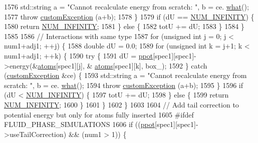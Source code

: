 \begin{DoxyCode}
1576                 std::string a = \textcolor{stringliteral}{"Cannot recalculate energy from scratch: "}, b = ce.
      \hyperlink{classcustom_exception_aeb6ab5848b038adfc68fde86a512f691}{what}();
1577                 \textcolor{keywordflow}{throw} \hyperlink{classcustom_exception}{customException} (a+b);
1578             \}
1579             \textcolor{keywordflow}{if} (dU == \hyperlink{potentials_8h_ab94ab1d09e2291d03fe92a0e24a9d33b}{NUM\_INFINITY}) \{
1580                 \textcolor{keywordflow}{return} \hyperlink{potentials_8h_ab94ab1d09e2291d03fe92a0e24a9d33b}{NUM\_INFINITY};
1581             \} \textcolor{keywordflow}{else} \{
1582                 totU += dU;
1583             \}
1584         \}
1585 
1586         \textcolor{comment}{// Interactions with same type}
1587         \textcolor{keywordflow}{for} (\textcolor{keywordtype}{unsigned} \textcolor{keywordtype}{int} j = 0; j < num1+adj1; ++j) \{
1588             \textcolor{keywordtype}{double} dU = 0.0;
1589             \textcolor{keywordflow}{for} (\textcolor{keywordtype}{unsigned} \textcolor{keywordtype}{int} k = j+1; k < num1+adj1; ++k) \{
1590                 \textcolor{keywordflow}{try} \{
1591                     dU = \hyperlink{classsim_system_ad2e290b5963f132e6a3a56cee35c8e9f}{ppot}[spec1][spec1]->energy(&\hyperlink{classsim_system_a90421b19082f7fb8fc23b7264b1161e4}{atoms}[spec1][j], &
      \hyperlink{classsim_system_a90421b19082f7fb8fc23b7264b1161e4}{atoms}[spec1][k], box\_);
1592                 \} \textcolor{keywordflow}{catch} (\hyperlink{classcustom_exception}{customException} &ce) \{
1593                     std::string a = \textcolor{stringliteral}{"Cannot recalculate energy from scratch: "}, b = ce.
      \hyperlink{classcustom_exception_aeb6ab5848b038adfc68fde86a512f691}{what}();
1594                     \textcolor{keywordflow}{throw} \hyperlink{classcustom_exception}{customException} (a+b);
1595                 \}
1596                 \textcolor{keywordflow}{if} (dU < \hyperlink{potentials_8h_ab94ab1d09e2291d03fe92a0e24a9d33b}{NUM\_INFINITY}) \{
1597                     totU += dU;
1598                 \} \textcolor{keywordflow}{else} \{
1599                     \textcolor{keywordflow}{return} \hyperlink{potentials_8h_ab94ab1d09e2291d03fe92a0e24a9d33b}{NUM\_INFINITY};
1600                 \}
1601             \}
1602         \}
1603 
1604         \textcolor{comment}{// Add tail correction to potential energy but only for atoms fully inserted}
1605 \textcolor{preprocessor}{#ifdef FLUID\_PHASE\_SIMULATIONS}
1606 \textcolor{preprocessor}{}        \textcolor{keywordflow}{if} ((\hyperlink{classsim_system_ad2e290b5963f132e6a3a56cee35c8e9f}{ppot}[spec1][spec1]->useTailCorrection) && (num1 > 1)) \{

\end{DoxyCode}

